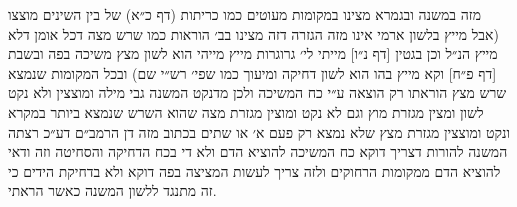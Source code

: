 \documentclass[12pt, openany]{book}
\begin{document}
\begin{multicols}{2}
מזה במשנה ובגמרא מצינו במקומות מעוטים כמו כריתות (דף כ״א) של בין השינים מוצצו (אבל מייץ בלשון ארמי אינו מזה הגזרה דזה מצינו בב׳ הוראות כמו שרש מצה דכל אומן דלא מייץ הנ״ל וכן בגטין [דף נ״ו] מייתי לי׳ גרוגרות מייץ מייהי הוא לשון מצץ משיכה בפה ובשבת [דף פ״ח] וקא מייץ בהו הוא לשון דחיקה ומיעוך כמו שפי׳ רש״י שם) ובכל המקומות שנמצא שרש מצץ הוראתו רק הוצאה ע״י כח המשיכה ולכן מדנקט המשנה גבי מילה ומוצצין ולא נקט לשון ומצין מגזרת מוץ וגם לא נקט ומוצין מגזרת מצה שהוא השרש שנמצא ביותר במקרא ונקט ומוצצין מגזרת מצץ שלא נמצא רק פעם א׳ או שתים בכתוב מזה דן הרמב״ם דע״כ רצתה המשנה להורות דצריך דוקא כח המשיכה להוציא הדם ולא די בכח הדחיקה והסחיטה וזה ודאי להוציא הדם ממקומות הרחוקים ולזה צריך לעשות המציצה בפה דוקא ולא בדחיקת הידים כי זה מתנגד ללשון המשנה כאשר הראתי.\\\vspace{0pt}


\end{multicols}
\end{document}
